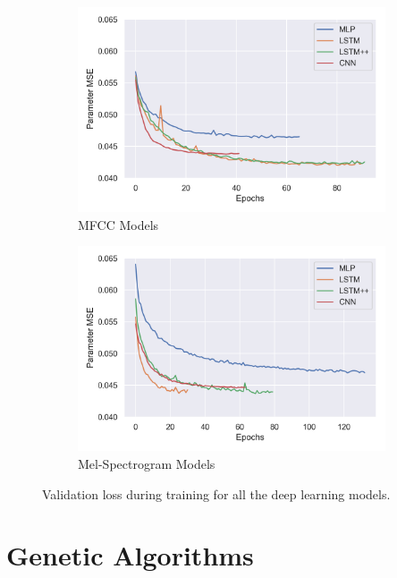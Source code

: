 \begin{figure}[ht]
    \centering
    \begin{subfigure}[b]{0.49\textwidth}
        \centering
        \includegraphics[width=\textwidth]{figures/inverse-synth/mfcc-model-loss}
        \caption{MFCC Models}
    \end{subfigure}
    \begin{subfigure}[b]{0.49\textwidth}
        \centering
        \includegraphics[width=\textwidth]{figures/inverse-synth/mel-model-loss.png}
        \caption{Mel-Spectrogram Models}
    \end{subfigure}
    \caption{Validation loss during training for all the deep learning models.}
    \label{fig:training-loss}
\end{figure}

\section{Genetic Algorithms}
\label{inverse-synth:ga}

